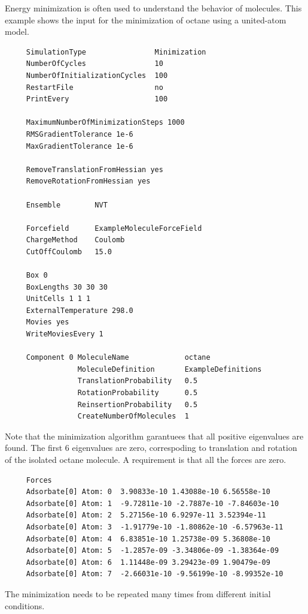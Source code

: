 Energy minimization is often used to understand the behavior of molecules.
This example shows the input for the minimization of octane using a united-atom model\cite{Dubbeldam2004}.
\begin{tiny}
\begin{verbatim}
     SimulationType                Minimization
     NumberOfCycles                10
     NumberOfInitializationCycles  100
     RestartFile                   no
     PrintEvery                    100
     
     MaximumNumberOfMinimizationSteps 1000
     RMSGradientTolerance 1e-6
     MaxGradientTolerance 1e-6
     
     RemoveTranslationFromHessian yes
     RemoveRotationFromHessian yes
     
     Ensemble        NVT
     
     Forcefield      ExampleMoleculeForceField
     ChargeMethod    Coulomb
     CutOffCoulomb   15.0
     
     Box 0
     BoxLengths 30 30 30
     UnitCells 1 1 1
     ExternalTemperature 298.0
     Movies yes
     WriteMoviesEvery 1
     
     Component 0 MoleculeName             octane
                 MoleculeDefinition       ExampleDefinitions
                 TranslationProbability   0.5
                 RotationProbability      0.5
                 ReinsertionProbability   0.5
                 CreateNumberOfMolecules  1
\end{verbatim}
\end{tiny}
Note that the minimization algorithm garantuees that all positive eigenvalues are found.
The first 6 eigenvalues are zero, correspoding to translation and rotation of the isolated octane molecule.
A requirement is that all the forces are zero.
\begin{tiny}
\begin{verbatim}
     Forces
     Adsorbate[0] Atom: 0  3.90833e-10 1.43088e-10 6.56558e-10
     Adsorbate[0] Atom: 1  -9.72811e-10 -2.7887e-10 -7.84603e-10
     Adsorbate[0] Atom: 2  5.27156e-10 6.9297e-11 3.52394e-11
     Adsorbate[0] Atom: 3  -1.91779e-10 -1.80862e-10 -6.57963e-11
     Adsorbate[0] Atom: 4  6.83851e-10 1.25738e-09 5.36808e-10
     Adsorbate[0] Atom: 5  -1.2857e-09 -3.34806e-09 -1.38364e-09
     Adsorbate[0] Atom: 6  1.11448e-09 3.29423e-09 1.90479e-09
     Adsorbate[0] Atom: 7  -2.66031e-10 -9.56199e-10 -8.99352e-10
\end{verbatim}
\end{tiny}
The minimization needs to be repeated many times from different initial conditions.
